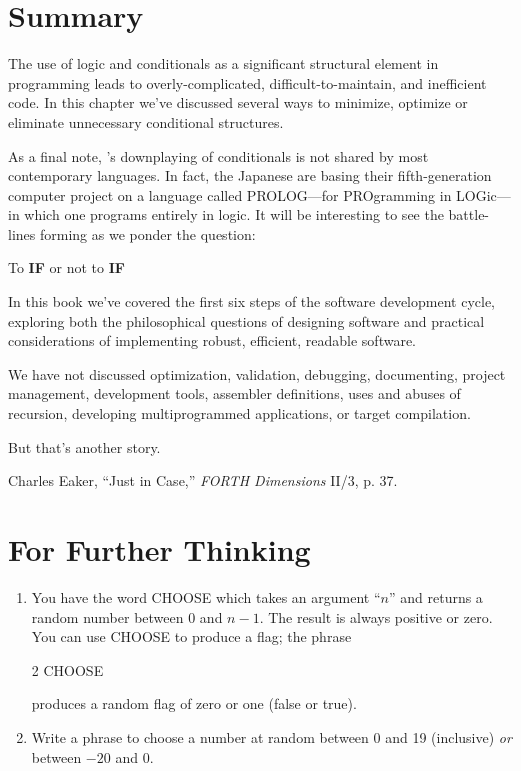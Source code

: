 \section{Summary}

The use of logic and conditionals as a significant structural element in
programming leads to overly-complicated, difficult-to-maintain, and
inefficient code. In this chapter we've discussed several ways to minimize,
optimize or eliminate unnecessary conditional structures.

As a final note, \Forth{}'s downplaying of conditionals is not shared
by most contemporary languages. In fact, the Japanese are basing their
fifth-generation computer project on a language called PROLOG---for
PROgramming in LOGic---in which one programs entirely in logic. It will
be interesting to see the battle-lines forming as we ponder the question:

To \textbf{IF} or not to \textbf{IF}

In this book we've covered the first six steps of the software development
cycle, exploring both the philosophical questions of designing software
and practical considerations of implementing robust, efficient, readable
software.

We have not discussed optimization, validation, debugging, documenting,
project management, \Forth{} development tools, assembler
definitions, uses and abuses of recursion, developing multiprogrammed
applications, or target compilation.

But that's another story.

\begin{references}{9}
 Charles Eaker, ``Just in Case,'' \emph{FORTH
Dimensions} II/3, p. 37.
\end{references}

\section{For Further Thinking}

\begin{enumerate}
\item You have the word CHOOSE which takes an argument ``$n$'' and returns a
random number between 0 and $n-1$. The result is always positive or zero.
You can use CHOOSE to produce a flag; the phrase
\begin{Code}
2 CHOOSE
\end{Code}
produces a random flag of zero or one (false or true).

\item Write a phrase to choose a number at random between 0 and 19 (inclusive)
\emph{or} between $-20$ and 0.
\end{enumerate}

